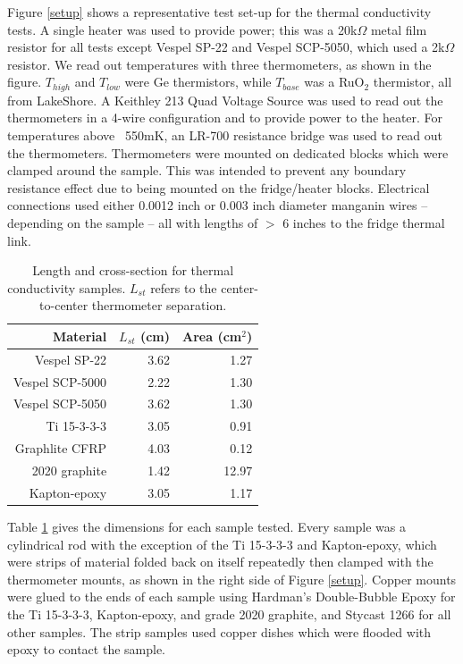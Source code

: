 \documentclass[final]{svjour2}
\begin{document}
Figure \ref{setup} shows a representative test set-up for the thermal conductivity tests. A single heater was used to provide power; this was a 20k$\Omega$ metal film resistor for all tests except Vespel SP-22 and Vespel SCP-5050, which used a 2k$\Omega$ resistor. We read out temperatures with three thermometers, as shown in the figure. $T_{high}$ and $T_{low}$ were Ge thermistors, while $T_{base}$ was a RuO$_2$ thermistor, all from LakeShore\footnotemark.  A Keithley 213 Quad Voltage Source was used to read out the thermometers in a 4-wire configuration and to provide power to the heater. For temperatures above ~550mK, an LR-700 resistance bridge was used to read out the thermometers. Thermometers were mounted on dedicated blocks which were clamped around the sample. This was intended to prevent any boundary resistance effect due to being mounted on the fridge/heater blocks. Electrical connections used either 0.0012 inch or 0.003 inch diameter manganin wires -- depending on the sample -- all with lengths of $>$ 6 inches to the fridge thermal link.

\begin{table}
\centering
\small
{}
\begin{tabular}{rrr}
\toprule
\textbf{Material} & $L_{st}$ (cm) & Area (cm$^2$) \\\midrule
Vespel SP-22 & 3.62 & 1.27 \\
Vespel SCP-5000 & 2.22 & 1.30 \\
Vespel SCP-5050 & 3.62 & 1.30 \\
Ti 15-3-3-3 & 3.05 & 0.91 \\
Graphlite CFRP & 4.03 & 0.12 \\
2020 graphite & 1.42 & 12.97 \\
Kapton-epoxy & 3.05 & 1.17 \\
\bottomrule
\end{tabular}
\caption{{\small Length and cross-section for thermal conductivity samples. $L_{st}$ refers to the center-to-center thermometer separation.}}
\label{dim}
\end{table}

Table \ref{dim} gives the dimensions for each sample tested. Every sample was a cylindrical rod with the exception of the Ti 15-3-3-3 and Kapton-epoxy, which were strips of material folded back on itself repeatedly then clamped with the thermometer mounts, as shown in the right side of Figure \ref{setup}. Copper mounts were glued to the ends of each sample using Hardman's Double-Bubble Epoxy for the Ti 15-3-3-3, Kapton-epoxy, and grade 2020 graphite, and Stycast 1266 for all other samples. The strip samples used copper dishes which were flooded with epoxy to contact the sample.
\end{document}
